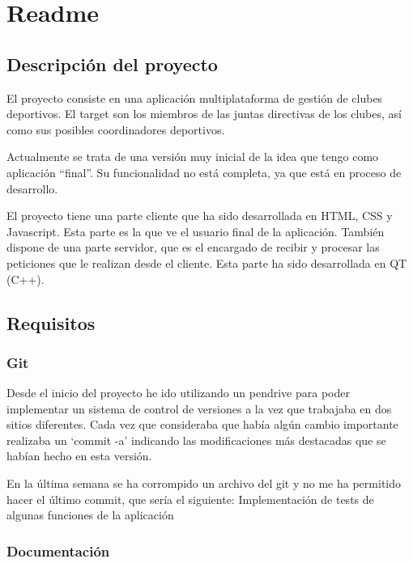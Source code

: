 

 \section*{Readme}

\subsection*{Descripción del proyecto}

El proyecto consiste en una aplicación multiplataforma de gestión de clubes deportivos. El target son los miembros de las juntas directivas de los clubes, así como sus posibles coordinadores deportivos.

Actualmente se trata de una versión muy inicial de la idea que tengo como aplicación “final”. Su funcionalidad no está completa, ya que está en proceso de desarrollo.

El proyecto tiene una parte cliente que ha sido desarrollada en H\+T\+ML, C\+SS y Javascript. Esta parte es la que ve el usuario final de la aplicación. También dispone de una parte servidor, que es el encargado de recibir y procesar las peticiones que le realizan desde el cliente. Esta parte ha sido desarrollada en QT (C++).

\subsection*{Requisitos}

\subsubsection*{Git}

Desde el inicio del proyecto he ido utilizando un pendrive para poder implementar un sistema de control de versiones a la vez que trabajaba en dos sitios diferentes. Cada vez que consideraba que había algún cambio importante realizaba un ‘commit -\/a’ indicando las modificaciones más destacadas que se habían hecho en esta versión.

En la última semana se ha corrompido un archivo del git y no me ha permitido hacer el último commit, que sería el siguiente\+: Implementación de tests de algunas funciones de la aplicación

\subsubsection*{Documentación}


